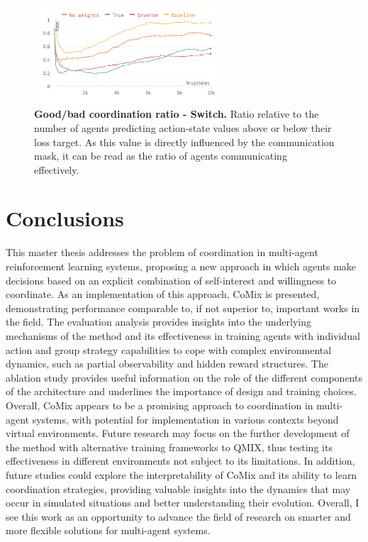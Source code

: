 \documentclass[a4paper,singleside,12pt]{report} %
\begin{document}
  \begin{figure}
    \centering
    \includegraphics[width=7cm]{images/ablation_comm_ratio.png}
    \caption{\textbf{Good/bad coordination ratio - Switch.} Ratio relative to the number of agents predicting action-state values above or below their loss target. As this value is directly influenced by the communication mask, it can be read as the ratio of agents communicating effectively.}
    \label{fig:ablation-comm}
  \end{figure}

\section{Conclusions}\label{conclusions}
This master thesis addresses the problem of coordination in multi-agent reinforcement learning systems, proposing a new approach in which agents make decisions based on an explicit combination of self-interest and willingness to coordinate. As an implementation of this approach, CoMix is presented, demonstrating performance comparable to, if not superior to, important works in the field. The evaluation analysis provides insights into the underlying mechanisms of the method and its effectiveness in training agents with individual action and group strategy capabilities to cope with complex environmental dynamics, such as partial observability and hidden reward structures. The ablation study provides useful information on the role of the different components of the architecture and underlines the importance of design and training choices.
Overall, CoMix appears to be a promising approach to coordination in multi-agent systems, with potential for implementation in various contexts beyond virtual environments. Future research may focus on the further development of the method with alternative training frameworks to QMIX, thus testing its effectiveness in different environments not subject to its limitations. In addition, future studies could explore the interpretability of CoMix and its ability to learn coordination strategies, providing valuable insights into the dynamics that may occur in simulated situations and better understanding their evolution. Overall, I see this work as an opportunity to advance the field of research on smarter and more flexible solutions for multi-agent systems.
\end{document}
